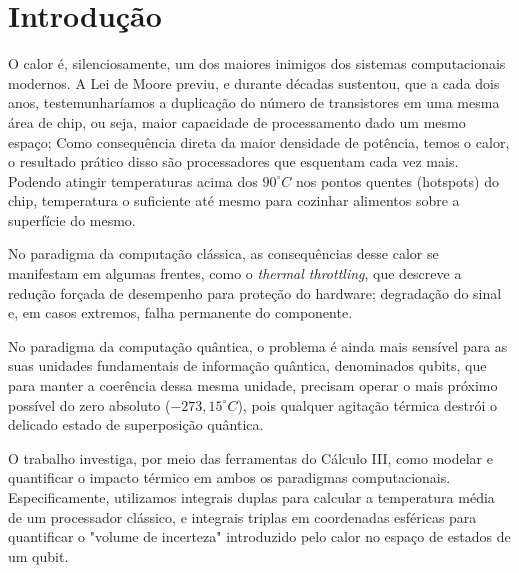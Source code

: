 

\section{Introdução}
O calor é, silenciosamente, um dos maiores inimigos dos sistemas computacionais modernos. A Lei de Moore previu, e durante décadas sustentou, que a cada dois anos, testemunharíamos a duplicação do número de transistores em uma mesma área de chip, ou seja, maior capacidade de processamento dado um mesmo espaço; Como consequência direta da maior densidade de potência, temos o calor, o resultado prático disso são processadores que esquentam cada vez mais. Podendo atingir temperaturas acima dos $90^{\circ}C$ nos pontos quentes (hotspots) do chip, temperatura o suficiente até mesmo para cozinhar alimentos sobre a superfície do mesmo.

No paradigma da computação clássica, as consequências desse calor se manifestam em algumas frentes, como o \textit{thermal throttling}, que descreve a redução forçada de desempenho para proteção do hardware; degradação do sinal e, em casos extremos, falha permanente do componente. 

No paradigma da computação quântica, o problema é ainda mais sensível para as suas  unidades fundamentais de informação quântica, denominados qubits, que para manter a coerência dessa mesma unidade, precisam operar o mais próximo possível do zero absoluto ($-273,15^{\circ}C$), pois qualquer agitação térmica destrói o delicado estado de superposição quântica.

O trabalho investiga, por meio das ferramentas do Cálculo III, como modelar e quantificar o impacto térmico em ambos os paradigmas computacionais. Especificamente, utilizamos integrais duplas para calcular a temperatura média de um processador clássico, e integrais triplas em coordenadas esféricas para quantificar o "volume de incerteza" introduzido pelo calor no espaço de estados de um qubit.